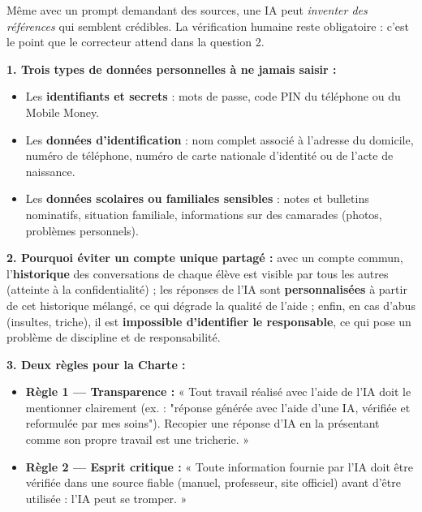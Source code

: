 \documentclass[11pt]{article}
\begin{document}
\begin{attention}
Même avec un prompt demandant des sources, une IA peut \emph{inventer des références} qui semblent crédibles. La vérification humaine reste obligatoire : c'est le point que le correcteur attend dans la question 2.
\end{attention}

\begin{corrige}
\textbf{1. Trois types de données personnelles à ne jamais saisir :}
\begin{itemize}
    \item Les \textbf{identifiants et secrets} : mots de passe, code PIN du téléphone ou du Mobile Money.
    \item Les \textbf{données d'identification} : nom complet associé à l'adresse du domicile, numéro de téléphone, numéro de carte nationale d'identité ou de l'acte de naissance.
    \item Les \textbf{données scolaires ou familiales sensibles} : notes et bulletins nominatifs, situation familiale, informations sur des camarades (photos, problèmes personnels).
\end{itemize}

\textbf{2. Pourquoi éviter un compte unique partagé :} avec un compte commun, l'\textbf{historique} des conversations de chaque élève est visible par tous les autres (atteinte à la confidentialité) ; les réponses de l'IA sont \textbf{personnalisées} à partir de cet historique mélangé, ce qui dégrade la qualité de l'aide ; enfin, en cas d'abus (insultes, triche), il est \textbf{impossible d'identifier le responsable}, ce qui pose un problème de discipline et de responsabilité.

\textbf{3. Deux règles pour la Charte :}
\begin{itemize}
    \item \textbf{Règle 1 — Transparence :} « Tout travail réalisé avec l'aide de l'IA doit le mentionner clairement (ex. : "réponse générée avec l'aide d'une IA, vérifiée et reformulée par mes soins"). Recopier une réponse d'IA en la présentant comme son propre travail est une tricherie. »
    \item \textbf{Règle 2 — Esprit critique :} « Toute information fournie par l'IA doit être vérifiée dans une source fiable (manuel, professeur, site officiel) avant d'être utilisée : l'IA peut se tromper. »
\end{itemize}


\end{corrige}
\end{document}
